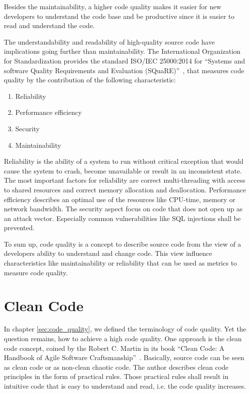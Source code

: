 Besides the maintainability, a higher code quality makes it easier for new developers to understand the code base and be productive since it is easier to read and understand the code.

The understandability and readability of high-quality source code have implications going further than maintainability. The International Organization for Standardization provides the standard ISO/IEC 25000:2014 for \enquote{Systems and software Quality Requirements and Evaluation (SQuaRE)}~\cite{iso_central_secretary_systems_2014}, that measures code quality by the contribution of the following characteristic:
\begin{enumerate}
    \item Reliability
    \item Performance efficiency
    \item Security
    \item Maintainability
\end{enumerate}
Reliability is the ability of a system to run without critical exception that would cause the system to crash, become unavailable or result in an inconsistent state. The most important factors for reliability are correct multi-threading with access to shared resources and correct memory allocation and deallocation. Performance efficiency describes an optimal use of the resources like CPU-time, memory or network bandwidth. The security aspect focus on code that does not open up as an attack vector. Especially common vulnerabilities like SQL injections shall be prevented.

To sum up, code quality is a concept to describe source code from the view of a developers ability to understand and change code. This view influence characteristics like maintainability or reliability that can be used as metrics to measure code quality. 

\section{Clean Code}\label{sec:clean_code}
In chapter \ref{sec:code_quality}, we defined the terminology of code quality. Yet the question remains, how to achieve a high code quality. One approach is the clean code concept, coined by the Robert C. Martin in its book \enquote{Clean Code: A Handbook of Agile Software Craftsmanship}~\cite{martin_clean_2009}. Basically, source code can be seen as clean code or as non-clean chaotic code. The author describes clean code principles in the form of practical rules. Those practical rules shall result in intuitive code that is easy to understand and read, i.e. the code quality increases.

